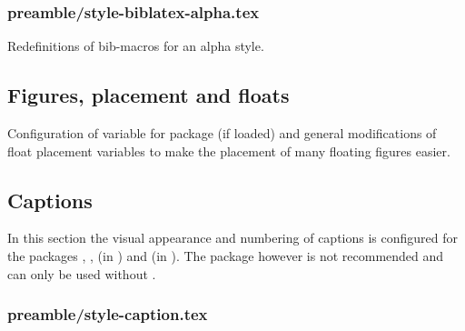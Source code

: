 
\subsubsection{preamble/style-biblatex-alpha.tex}

Redefinitions of bib-macros for an alpha style.


\subsection{Figures, placement and floats}
\label{sec:style:figures}

Configuration of variable for package  (if loaded) and 
general modifications of float placement variables to make the placement of 
many floating figures easier.


\subsection{Captions}
\label{sec:style:captions}

In this section the visual appearance and numbering of captions is configured 
for the packages , , 
 (in ) and  (in ). 
The package  however is not 
recommended and can only be used without .


\subsubsection{preamble/style-caption.tex}

